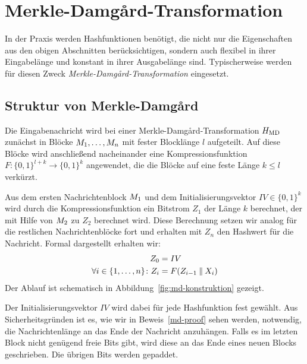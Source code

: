 \section{Merkle-Damgård-Transformation}
\label{ch:hash:merkledamgard}
In der Praxis werden Hashfunktionen benötigt, die nicht nur die Eigenschaften aus den obigen Abschnitten berücksichtigen, sondern auch flexibel in ihrer
Eingabelänge und konstant in ihrer Ausgabelänge sind. Typischerweise werden für diesen Zweck \emph{Merkle-Damgård-Transformation} eingesetzt. 

\subsection{Struktur von Merkle-Damgård}
Die Eingabenachricht wird bei einer Merkle-Damgård-Transformation \indexMDTransformation $H_{\textnormal{MD}}$ zunächst in Blöcke $M_{1},\dots, M_{n}$ mit fester Blocklänge $l$ aufgeteilt.
Auf diese Blöcke wird anschließend nacheinander eine Kompressionsfunktion $F \colon \{0, 1\}^{l + k} \rightarrow \{0,1\}^{k}$ angewendet, die %
die Blöcke auf eine feste Länge $k \leq l$ verkürzt.

Aus dem ersten Nachrichtenblock $M_{1}$ und dem Initialisierungsvektor $IV \in \{0, 1\}^k$  wird durch die Kompressionsfunktion ein Bitstrom $Z_1$ der Länge $k$
berechnet, der mit Hilfe von $M_2$ zu $Z_2$ berechnet wird. Diese Berechnung setzen wir analog für die restlichen Nachrichtenblöcke fort und erhalten mit $Z_{n}$ den Hashwert für die Nachricht. Formal dargestellt erhalten wir:
\begin{align*}
	Z_0 &= IV\\
	\forall i \in \{1,\dots, n\}\colon Z_{i} &= F(Z_{i-1} \mathbin{\|} X_{i})
\end{align*}
Der Ablauf ist schematisch in Abbildung~\ref{fig:md-konstruktion} gezeigt.

Der Initialisierungsvektor $IV$ \indexIV wird dabei für jede Hashfunktion fest gewählt. Aus Sicherheitsgründen ist es, wie wir in Beweis~\ref{md-proof} sehen werden, notwendig, die Nachrichtenlänge an das Ende der Nachricht anzuhängen. Falls es im letzten Block nicht genügend freie Bits gibt, wird diese an das Ende eines neuen Blocks geschrieben. Die übrigen Bits werden gepaddet.

